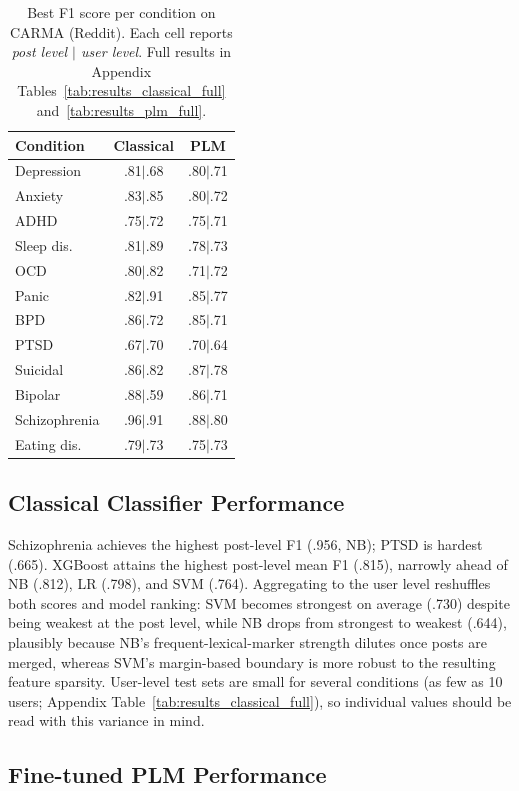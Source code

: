 \documentclass[letterpaper]{article} %
\begin{document}
\begin{table}[t]
\centering
\small
\begin{tabular}{lcc}
\toprule
\textbf{Condition} & \textbf{Classical} & \textbf{PLM} \\
\midrule
Depression & .81$|$.68 & .80$|$.71 \\
Anxiety & .83$|$.85 & .80$|$.72 \\
ADHD & .75$|$.72 & .75$|$.71 \\
Sleep dis. & .81$|$.89 & .78$|$.73 \\
OCD & .80$|$.82 & .71$|$.72 \\
Panic & .82$|$.91 & .85$|$.77 \\
BPD & .86$|$.72 & .85$|$.71 \\
PTSD & .67$|$.70 & .70$|$.64 \\
Suicidal & .86$|$.82 & .87$|$.78 \\
Bipolar & .88$|$.59 & .86$|$.71 \\
Schizophrenia & .96$|$.91 & .88$|$.80 \\
Eating dis. & .79$|$.73 & .75$|$.73 \\
\bottomrule
\end{tabular}
\caption{Best F1 score per condition on CARMA (Reddit). Each cell reports \textit{post level $|$ user level}. Full results in Appendix Tables~\ref{tab:results_classical_full} and~\ref{tab:results_plm_full}.}
\label{tab:results_summary}
\end{table}

\subsection{Classical Classifier Performance}

Schizophrenia achieves the highest post-level F1 (.956, NB); PTSD is hardest (.665). XGBoost attains the highest post-level mean F1 (.815), narrowly ahead of NB (.812), LR (.798), and SVM (.764). Aggregating to the user level reshuffles both scores and model ranking: SVM becomes strongest on average (.730) despite being weakest at the post level, while NB drops from strongest to weakest (.644), plausibly because NB's frequent-lexical-marker strength dilutes once posts are merged, whereas SVM's margin-based boundary is more robust to the resulting feature sparsity. User-level test sets are small for several conditions (as few as 10 users; Appendix Table~\ref{tab:results_classical_full}), so individual values should be read with this variance in mind.

\subsection{Fine-tuned PLM Performance}
\end{document}
